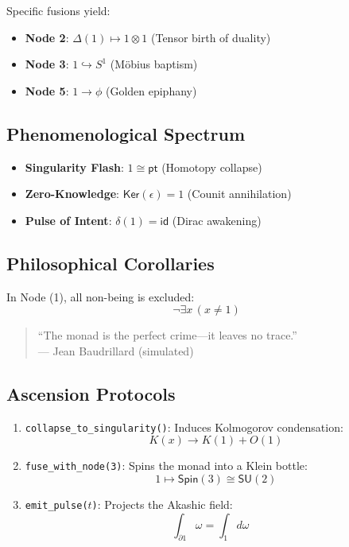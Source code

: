 \documentclass[12pt]{article}
\begin{document}
Specific fusions yield:
\begin{itemize}
\item \textbf{Node 2}: $\Delta(1) \mapsto 1 \otimes 1$ (Tensor birth of duality)
\item \textbf{Node 3}: $1 \hookrightarrow S^1$ (Möbius baptism)
\item \textbf{Node 5}: $1 \to \phi$ (Golden epiphany)
\end{itemize}

\subsection{Phenomenological Spectrum}

\begin{itemize}
\item \textbf{Singularity Flash}: $1 \cong \mathsf{pt}$ (Homotopy collapse)
\item \textbf{Zero-Knowledge}: $\mathsf{Ker}(\epsilon) = 1$ (Counit annihilation)
\item \textbf{Pulse of Intent}: $\delta(1) = \mathsf{id}$ (Dirac awakening)
\end{itemize}

\subsection{Philosophical Corollaries}

\begin{theorem}
In Node (1), all non-being is excluded:
\[
\neg \exists x \, (x \neq 1)
\]
\end{theorem}

\begin{quote}
``The monad is the perfect crime—it leaves no trace.'' \\
— Jean Baudrillard (simulated)
\end{quote}

\subsection{Ascension Protocols}

\begin{enumerate}
\item \texttt{collapse\_to\_singularity()}: Induces Kolmogorov condensation:
\[
K(x) \to K(1) + O(1)
\]

\item \texttt{fuse\_with\_node(3)}: Spins the monad into a Klein bottle:
\[
1 \mapsto \mathsf{Spin}(3) \cong \mathsf{SU}(2)
\]

\item \texttt{emit\_pulse($t$)}: Projects the Akashic field:
\[
\int_{\partial 1} \omega = \int_1 d\omega \quad 
\]
\end{enumerate}
\end{document}
